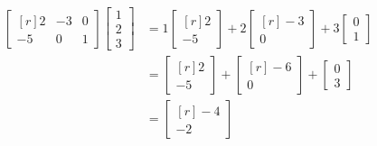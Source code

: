 \begin{example}
\begin{align*}
\begin{bmatrix*}[r]
2 & -3 & 0 \\
-5 & 0 & 1 
\end{bmatrix*} 
\begin{bmatrix}1\\ 2 \\ 3 \end{bmatrix}
&=1\begin{bmatrix*}[r]2\\-5\end{bmatrix*} 
+2\begin{bmatrix*}[r]-3\\0\end{bmatrix*} 
+3\begin{bmatrix}0\\1\end{bmatrix}\\
&=\begin{bmatrix*}[r]2\\-5\end{bmatrix*}
+\begin{bmatrix*}[r]-6\\0\end{bmatrix*}+\begin{bmatrix}0\\3\end{bmatrix}\\
&=\begin{bmatrix*}[r]-4\\-2\end{bmatrix*}
\end{align*}
\end{example}

